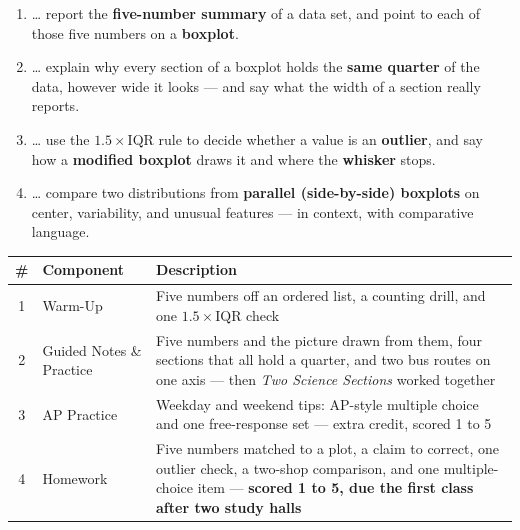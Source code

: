 \documentclass[12pt]{article}
\begin{document}

\namedateperiod
\vspace{0.18in}

\boxguard[14]
\begin{learningtargetbox}
\small
\begin{enumerate}[leftmargin=1.5em, itemsep=5pt]
  \item \ldots{} report the \textbf{five-number summary} of a data set, and point to each of
        those five numbers on a \textbf{boxplot}.
  \item \ldots{} explain why every section of a boxplot holds the \textbf{same quarter} of the
        data, however wide it looks --- and say what the width of a section really reports.
  \item \ldots{} use the $1.5 \times \text{IQR}$ rule to decide whether a value is an
        \textbf{outlier}, and say how a \textbf{modified boxplot} draws it and where the
        \textbf{whisker} stops.
  \item \ldots{} compare two distributions from \textbf{parallel (side-by-side) boxplots} on
        center, variability, and unusual features --- in context, with comparative language.
\end{enumerate}
\end{learningtargetbox}

\vspace{0.14in}

\boxguard[14]
\begin{tocbox}
\small
\renewcommand{\arraystretch}{1.5}
\begin{tabularx}{\linewidth}{@{} c l X @{}}
\rowcolor{sky}
\textbf{\#} & \textbf{Component} & \textbf{Description} \\
\midrule
1 & Warm-Up & Five numbers off an ordered list, a counting drill, and one $1.5 \times
                 \text{IQR}$ check \\
2 & Guided Notes \& Practice & Five numbers and the picture drawn from them, four sections that
                 all hold a quarter, and two bus routes on one axis --- then \emph{Two Science
                 Sections} worked together \\
3 & AP Practice & Weekday and weekend tips: AP-style multiple choice and one free-response set
                 --- extra credit, scored 1 to 5 \\
4 & Homework & Five numbers matched to a plot, a claim to correct, one outlier check, a
                 two-shop comparison, and one multiple-choice item --- \textbf{scored 1 to 5, due the
                 first class after two study halls} \\
\end{tabularx}
\end{tocbox}
\end{document}
